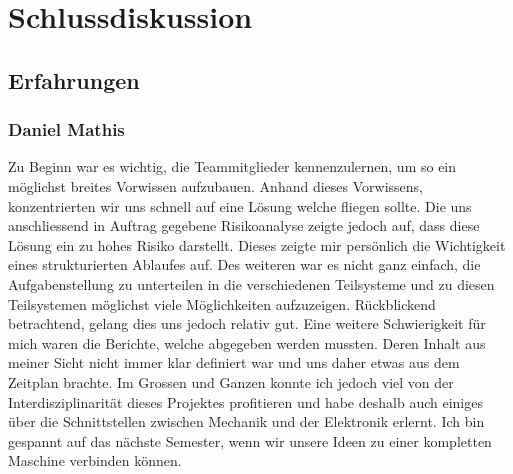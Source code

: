 \section{Schlussdiskussion}

\subsection{Erfahrungen}

\subsubsection*{Daniel Mathis}
Zu Beginn war es wichtig, die Teammitglieder kennenzulernen, um so ein 
möglichst breites Vorwissen aufzubauen. Anhand dieses Vorwissens, 
konzentrierten wir uns schnell auf eine Lösung welche fliegen sollte. Die uns 
anschliessend in Auftrag gegebene Risikoanalyse zeigte jedoch auf, dass diese 
Lösung ein zu hohes Risiko darstellt. Dieses zeigte mir persönlich die 
Wichtigkeit eines strukturierten Ablaufes auf. Des weiteren war es nicht ganz 
einfach, die Aufgabenstellung zu unterteilen in die verschiedenen Teilsysteme 
und zu diesen Teilsystemen möglichst viele Möglichkeiten aufzuzeigen. 
Rückblickend betrachtend, gelang dies uns jedoch relativ gut. Eine weitere 
Schwierigkeit für mich waren die Berichte, welche abgegeben werden mussten. 
Deren Inhalt aus meiner Sicht nicht immer klar definiert war und uns daher 
etwas aus dem Zeitplan brachte. Im Grossen und Ganzen konnte ich jedoch viel 
von der Interdisziplinarität dieses Projektes profitieren und habe deshalb 
auch einiges über die Schnittstellen zwischen Mechanik und der Elektronik 
erlernt. Ich bin gespannt auf das nächste Semester, wenn wir unsere Ideen zu 
einer kompletten Maschine verbinden können.

